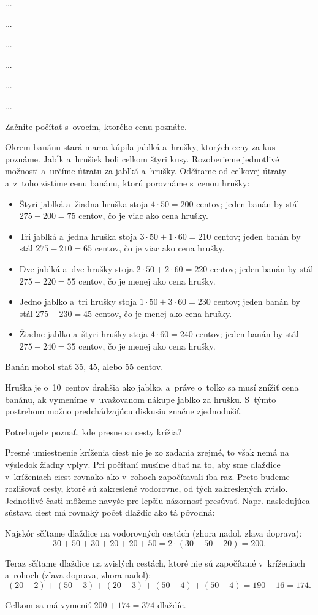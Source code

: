 ﻿{%
...}

{%
...}

{%
...}

{%
...}

{%
...}

{%
...}

{%
\napad
Začnite počítať s~ovocím, ktorého cenu poznáte.

\riesenie
Okrem banánu stará mama kúpila jablká a~hrušky, ktorých ceny za kus poznáme.
Jabĺk a~hrušiek boli celkom štyri kusy.
Rozoberieme jednotlivé možnosti a~určíme útratu za jablká a~hrušky.
Odčítame od celkovej útraty a~z~toho zistíme cenu banánu, ktorú porovnáme s~cenou hrušky:
\begin{itemize}
\item Štyri jablká a~žiadna hruška stoja $4\cdot50=200$ centov; jeden banán by stál ${275-200}=75$ centov, čo je viac ako cena hrušky.
\item Tri jablká a~jedna hruška stoja $3\cdot50+1\cdot60=210$ centov; jeden banán by stál $275-210=65$ centov, čo je viac ako cena hrušky.
\item Dve jablká a~dve hrušky stoja $2\cdot50+2\cdot60=220$ centov; jeden banán by stál $275-220=55$ centov, čo je menej ako cena hrušky.
\item Jedno jablko a~tri hrušky stoja $1\cdot50+3\cdot60=230$ centov; jeden banán by stál $275-230=45$ centov, čo je menej ako cena hrušky.
\item Žiadne jablko a~štyri hrušky stoja $4\cdot60=240$ centov; jeden banán by stál ${275-240}=35$ centov, čo je menej ako cena hrušky.
\end{itemize}
Banán mohol stať 35, 45, alebo 55 centov.

\poznamka
Hruška je o~10~centov drahšia ako jablko, a~práve o~toľko sa musí znížiť cena banánu, ak vymeníme v~uvažovanom nákupe jablko za hrušku.
S~týmto postrehom možno predchádzajúcu diskusiu značne zjednodušiť.
}

{%
\napad
Potrebujete poznať, kde presne sa cesty krížia?

\riesenie
Presné umiestnenie kríženia ciest nie je zo zadania zrejmé, to však nemá na výsledok žiadny vplyv.
Pri počítaní musíme dbať na to, aby sme dlaždice v~kríženiach ciest rovnako ako v~rohoch započítavali iba raz.
Preto budeme rozlišovať cesty, ktoré sú zakreslené vodorovne, od tých zakreslených zvislo.
Jednotlivé časti môžeme navyše pre lepšiu názornosť presúvať.
Napr. nasledujúca sústava ciest má rovnaký počet dlaždíc ako tá pôvodná:
%


Najskôr sčítame dlaždice na vodorovných cestách (zhora nadol, zľava doprava):
$$
30+50+30+20+20+50 =2\cdot(30+50+20) =200.
$$

Teraz sčítame dlaždice na zvislých cestách, ktoré nie sú započítané v~kríženiach a~rohoch (zľava doprava, zhora nadol):
$$
(20-2)+(50-3)+(20-3)+(50-4)+(50-4) =190-16 =174.
$$

Celkom sa má vymeniť $200+174=374$ dlaždíc.
}

